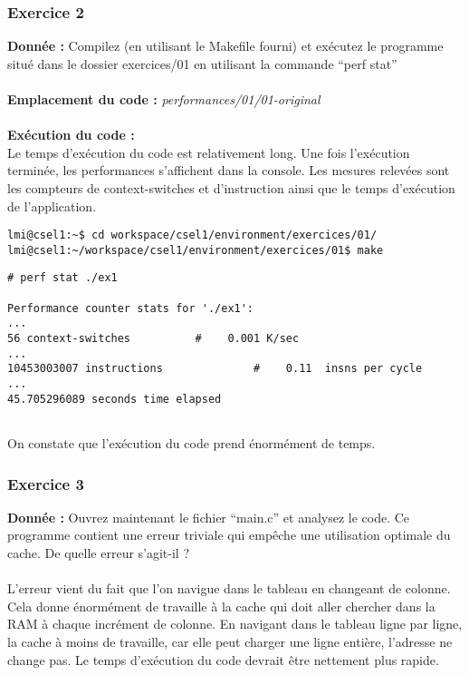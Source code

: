 \subsubsection{Exercice 2}
\textbf{Donnée : } Compilez	(en	utilisant	le	Makefile	fourni)	et	exécutez	le	programme	situé	dans	le	dossier	exercices/01	
en	utilisant	la	commande	“perf	stat”
\\\\
\textbf{Emplacement du code : }\textit{performances/01/01-original}\\\\
\textbf{Exécution du code : } \\
Le temps d'exécution du code est relativement long. Une fois l'exécution terminée, les performances s'affichent dans la console. Les mesures relevées sont les compteurs de context-switches et d'instruction ainsi que le temps d'exécution de l'application.\\
\begin{lstlisting}
lmi@csel1:~$ cd workspace/csel1/environment/exercices/01/
lmi@csel1:~/workspace/csel1/environment/exercices/01$ make
\end{lstlisting}

\begin{lstlisting}
# perf stat ./ex1 

Performance counter stats for './ex1':
...        
56 context-switches          #    0.001 K/sec                  
... 
10453003007 instructions              #    0.11  insns per cycle        
...
45.705296089 seconds time elapsed


\end{lstlisting}
On constate que l'exécution du code prend énormément de temps.

\subsubsection{Exercice 3}
\textbf{Donnée : } Ouvrez	maintenant	le	fichier	“main.c”	et	analysez	le	code.
Ce	programme	contient	une	erreur	triviale	qui	empêche	une	utilisation	optimale	du	cache.	De	quelle	
erreur	s'agit-il	?\\\\
L'erreur vient du fait que l'on navigue dans le tableau en changeant de colonne. Cela donne énormément de travaille à la cache qui doit aller chercher dans la RAM à chaque incrément de colonne.
En navigant dans le tableau ligne par ligne, la cache à moins de travaille, car elle peut charger une ligne entière, l'adresse ne change pas. Le temps d'exécution du code devrait être nettement plus rapide.\\

